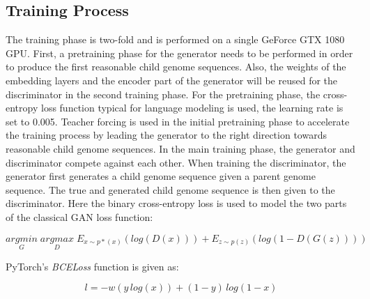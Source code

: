 \subsection{Training Process} \label{approachD}

The training phase is two-fold and is performed on a single GeForce GTX 1080 \ac{GPU}. First, a pretraining phase for the generator needs to be performed in order to produce the first reasonable child genome sequences. Also, the weights of the embedding layers and the encoder part of the generator will be reused for the discriminator in the second training phase. For the pretraining phase, the cross-entropy loss function typical for language modeling is used, the learning rate is set to 0.005. Teacher forcing is used in the initial pretraining phase to accelerate the training process by leading the generator to the right direction towards reasonable child genome sequences. In the main training phase, the generator and discriminator compete against each other. When training the discriminator, the generator first generates a child genome sequence given a parent genome sequence. The true and generated child genome sequence is then given to the discriminator. Here the binary cross-entropy loss is used to model the two parts of the classical \ac{GAN} loss function: 

\begin{equation}
	\underset{G}{arg min} \; \underset{D}{arg max} \; E_{x \sim p*(x)}(log(D(x))) + E_{z \sim p(z)}(log(1-D(G(z))))
\end{equation}

PyTorch's \textit{BCELoss} function is given as:

\begin{equation}
	l = -w(y\,log(x)) + (1-y)\,log(1-x)
\end{equation}

